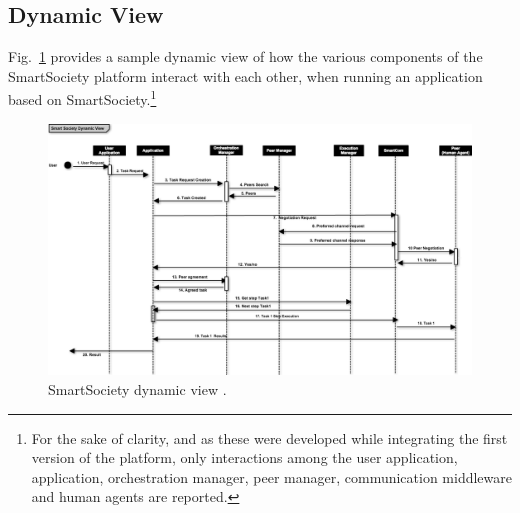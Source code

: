 \subsection{Dynamic View}
Fig.~\ref{fig:dynamic_view} provides a sample dynamic view of how the various components of the SmartSociety platform interact with each other, when running an application based on SmartSociety.\footnote{For the sake of clarity, and as these were developed while integrating the first version of the platform, only interactions among the user application, application, orchestration manager, peer manager, communication middleware and human agents are reported.} 
\begin{figure}
 \centering
 \includegraphics[width=1\textwidth]{figs/dynamic_view}
 \caption{SmartSociety dynamic view .}
 \label{fig:dynamic_view}
\end{figure}

